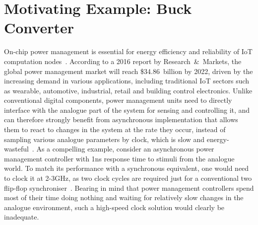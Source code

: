 \documentclass[british, journal]{IEEEtran}
\begin{document}
\section{Motivating Example: Buck Converter\label{sec:Motivating Example}}

On-chip power management is essential for energy efficiency and reliability of
IoT computation nodes~\cite{7287733}. According to a 2016 report by
Research~\&~Markets, the global power management market will reach \$34.86~billion
by 2022, driven by the increasing demand in various applications, including
traditional IoT sectors such as wearable, automotive, industrial, retail and
building control electronics. Unlike conventional digital components, power
management units need to directly interface with the analogue part of the system
for sensing and controlling it, and can therefore strongly benefit from asynchronous
implementation that allows them to react to changes in the system at the rate
they occur, instead of sampling various analogue parameters by clock, which is
slow and energy-wasteful~\cite{2014_sokolov_ftfc}\cite{sokolov2015design}.
As a compelling example, consider an asynchronous power management controller with
1ns response time to stimuli from the analogue world. To match its performance
with a synchronous equivalent, one would need to clock it at 2-3GHz, as two clock
cycles are required just for a conventional two flip-flop
synchroniser~\cite{2008_kinniment_synchronisation}. Bearing in mind that
power management controllers spend most of their time doing nothing and
waiting for relatively slow changes in the analogue environment, such
a high-speed clock solution would clearly be inadequate.
\end{document}
